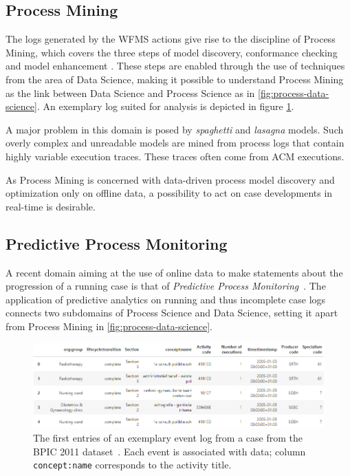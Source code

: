 \subsection{Process Mining}
The logs generated by the WFMS actions give rise to the discipline of Process Mining, which covers the three steps of model discovery, conformance checking and model enhancement \cite{Aalst2016}. These steps are enabled through the use of techniques from the area of Data Science, making it possible to understand Process Mining as the link between Data Science and Process Science as in \autoref{fig:process-data-science}. An exemplary log suited for analysis is depicted in figure \ref{fig:process-log}.

A major problem in this domain is posed by \textit{spaghetti} and \textit{lasagna} models. Such overly complex and unreadable models are mined from process logs that contain highly variable execution traces. These traces often come from ACM executions.

As Process Mining is concerned with data-driven process model discovery and optimization only on offline data, a possibility to act on case developments in real-time is desirable.

\subsection{Predictive Process Monitoring}
A recent domain aiming at the use of online data to make statements about the progression of a running case is that of \textit{Predictive Process Monitoring}~\cite{francescomarino2015, schoenig2018}. The application of predictive analytics on running and thus incomplete case logs connects two subdomains of Process Science and Data Science, setting it apart from Process Mining in \autoref{fig:process-data-science}.

\begin{figure}
    \centering
    \includegraphics[width=\textwidth]{gfx/process-log.png}
    \caption{The first entries of an exemplary event log from a case from the BPIC 2011 dataset~\cite{BPIC2011}. Each event is associated with data; column \texttt{concept:name} corresponds to the activity title.}
    \label{fig:process-log}
\end{figure}

